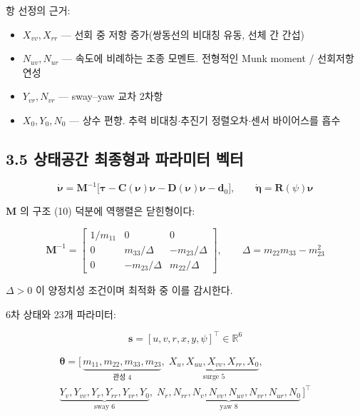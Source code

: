 \documentclass[10pt,a4paper]{article}
\begin{document}
항 선정의 근거:

\begin{itemize}[leftmargin=1.5em,itemsep=2pt,parsep=2pt,topsep=3pt]
\item $X_{vv}, X_{rr}$ --- 선회 중 저항 증가(쌍동선의 비대칭 유동, 선체 간 간섭)
\item $N_{uv}, N_{ur}$ --- 속도에 비례하는 조종 모멘트. 전형적인 Munk moment / 선회저항 연성
\item $Y_{vr}, N_{vr}$ --- sway--yaw 교차 2차항
\item $X_0, Y_0, N_0$ --- 상수 편향. 추력 비대칭$\cdot$추진기 정렬오차$\cdot$센서 바이어스를 흡수
\end{itemize}

\subsection*{3.5 상태공간 최종형과 파라미터 벡터}

\begin{equation*}
\dot{\boldsymbol{\nu}} = \mathbf{M}^{-1}\big[\boldsymbol{\tau}
- \mathbf{C}(\boldsymbol{\nu})\boldsymbol{\nu}
- \mathbf{D}(\boldsymbol{\nu})\boldsymbol{\nu} - \mathbf{d}_0\big],
\qquad
\dot{\boldsymbol{\eta}} = \mathbf{R}(\psi)\boldsymbol{\nu} \tag{15}
\end{equation*}

$\mathbf{M}$ 의 구조 (10) 덕분에 역행렬은 닫힌형이다:

\begin{equation*}
\mathbf{M}^{-1} = \begin{bmatrix}
1/m_{11} & 0 & 0 \\
0 & m_{33}/\Delta & -m_{23}/\Delta \\
0 & -m_{23}/\Delta & m_{22}/\Delta
\end{bmatrix},
\qquad \Delta = m_{22}m_{33} - m_{23}^2 \tag{16}
\end{equation*}

$\Delta > 0$ 이 양정치성 조건이며 최적화 중 이를 감시한다.

6차 상태와 23개 파라미터:

\begin{equation*}
\mathbf{s} = [u, v, r, x, y, \psi]^\top \in \mathbb{R}^6 \tag{17}
\end{equation*}

\begin{equation*}
\begin{gathered}
\boldsymbol{\theta} = \big[\,
\underbrace{m_{11}, m_{22}, m_{33}, m_{23}}_{\text{관성 4}},\;
\underbrace{X_u, X_{uu}, X_{vv}, X_{rr}, X_0}_{\text{surge 5}},\; \\
\underbrace{Y_v, Y_{vv}, Y_r, Y_{rr}, Y_{vr}, Y_0}_{\text{sway 6}},\;
\underbrace{N_r, N_{rr}, N_v, N_{vv}, N_{uv}, N_{vr}, N_{ur}, N_0}_{\text{yaw 8}}
\,\big]^\top
\end{gathered} \tag{18}
\end{equation*}
\end{document}
